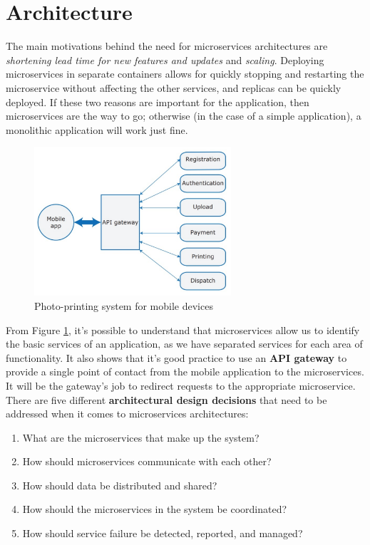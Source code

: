 \section{Architecture}

The main motivations behind the need for microservices architectures are \textit{shortening lead time for new features and updates} and \textit{scaling}. Deploying microservices in separate containers allows for quickly stopping and restarting the microservice without affecting the other services, and replicas can be quickly deployed. If these two reasons are important for the application, then microservices are the way to go; otherwise (in the case of a simple application), a monolithic application will work just fine.

\begin{figure} [H]
    \centering
    \includegraphics[width=0.65\textwidth]{images/Microservices/photo-printing-system.PNG}
    \caption{Photo-printing system for mobile devices}
    \label{fig:photo-printing-system}
\end{figure} 

From Figure \ref{fig:photo-printing-system}, it's possible to understand that microservices allow us to identify the basic services of an application, as we have separated services for each area of functionality. It also shows that it's good practice to use an \textbf{API gateway} to provide a single point of contact from the mobile application to the microservices. It will be the gateway's job to redirect requests to the appropriate microservice.\\
\newline \noindent
There are five different \textbf{architectural design decisions} that need to be addressed when it comes to microservices architectures:

\begin{enumerate}
    \item What are the microservices that make up the system?
    \item How should microservices communicate with each other?
    \item How should data be distributed and shared?
    \item How should the microservices in the system be coordinated?
    \item How should service failure be detected, reported, and managed?
\end{enumerate}

